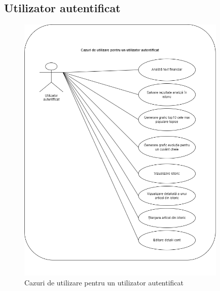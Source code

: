 \subsection{Utilizator autentificat}
\begin{figure}[ht]
	\centering
	\includegraphics[width=100mm]{figs/useCasesAuthenticated.png}
    \caption{Cazuri de utilizare pentru un utilizator autentificat}
	\label{fig:useCasesAuthenticated}
\end{figure}
